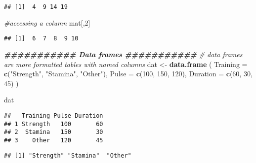 \documentclass[
]{article}
\newenvironment{Shaded}{\begin{snugshade}}{\end{snugshade}}
\newcommand{\AttributeTok}[1]{\textcolor[rgb]{0.13,0.29,0.53}{#1}}
\newcommand{\CommentTok}[1]{\textcolor[rgb]{0.56,0.35,0.01}{\textit{#1}}}
\newcommand{\DecValTok}[1]{\textcolor[rgb]{0.00,0.00,0.81}{#1}}
\newcommand{\DocumentationTok}[1]{\textcolor[rgb]{0.56,0.35,0.01}{\textbf{\textit{#1}}}}
\newcommand{\FunctionTok}[1]{\textcolor[rgb]{0.13,0.29,0.53}{\textbf{#1}}}
\newcommand{\NormalTok}[1]{#1}
\newcommand{\OtherTok}[1]{\textcolor[rgb]{0.56,0.35,0.01}{#1}}
\newcommand{\SpecialCharTok}[1]{\textcolor[rgb]{0.81,0.36,0.00}{\textbf{#1}}}
\newcommand{\StringTok}[1]{\textcolor[rgb]{0.31,0.60,0.02}{#1}}
\begin{document}
\begin{verbatim}
## [1]  4  9 14 19
\end{verbatim}

\begin{Shaded}
\begin{Highlighting}[]
\CommentTok{\#accessing a column}
\NormalTok{mat[,}\DecValTok{2}\NormalTok{]}
\end{Highlighting}
\end{Shaded}

\begin{verbatim}
## [1]  6  7  8  9 10
\end{verbatim}

\begin{Shaded}
\begin{Highlighting}[]
\DocumentationTok{\#\#\#\#\#\#\#\#\#\#\# Data frames \#\#\#\#\#\#\#\#\#\#\#}
\CommentTok{\# data frames are more formatted tables with named columns}
\NormalTok{dat }\OtherTok{\textless{}{-}} \FunctionTok{data.frame}\NormalTok{ (}
  \AttributeTok{Training =} \FunctionTok{c}\NormalTok{(}\StringTok{"Strength"}\NormalTok{, }\StringTok{"Stamina"}\NormalTok{, }\StringTok{"Other"}\NormalTok{),}
  \AttributeTok{Pulse =} \FunctionTok{c}\NormalTok{(}\DecValTok{100}\NormalTok{, }\DecValTok{150}\NormalTok{, }\DecValTok{120}\NormalTok{),}
  \AttributeTok{Duration =} \FunctionTok{c}\NormalTok{(}\DecValTok{60}\NormalTok{, }\DecValTok{30}\NormalTok{, }\DecValTok{45}\NormalTok{)}
\NormalTok{)}

\NormalTok{dat}
\end{Highlighting}
\end{Shaded}

\begin{verbatim}
##   Training Pulse Duration
## 1 Strength   100       60
## 2  Stamina   150       30
## 3    Other   120       45
\end{verbatim}

\begin{Shaded}
\end{Shaded}

\begin{verbatim}
## [1] "Strength" "Stamina"  "Other"
\end{verbatim}
\end{document}
